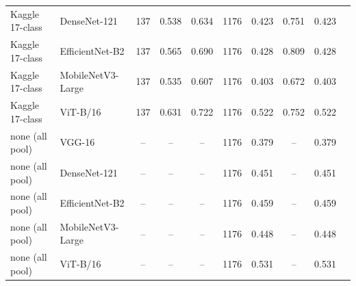 \begin{table}[!tbp]
\begin{tabular}{llcccccccc}
Kaggle 17-class & DenseNet-121 & 137 & 0.538 & 0.634 & 1176 & 0.423 & 0.751 & 0.423 \\
Kaggle 17-class & EfficientNet-B2 & 137 & 0.565 & 0.690 & 1176 & 0.428 & 0.809 & 0.428 \\
Kaggle 17-class & MobileNetV3-Large & 137 & 0.535 & 0.607 & 1176 & 0.403 & 0.672 & 0.403 \\
Kaggle 17-class & ViT-B/16 & 137 & 0.631 & 0.722 & 1176 & 0.522 & 0.752 & 0.522 \\
none (all pool) & VGG-16 & -- & -- & -- & 1176 & 0.379 & -- & 0.379 \\
none (all pool) & DenseNet-121 & -- & -- & -- & 1176 & 0.451 & -- & 0.451 \\
none (all pool) & EfficientNet-B2 & -- & -- & -- & 1176 & 0.459 & -- & 0.459 \\
none (all pool) & MobileNetV3-Large & -- & -- & -- & 1176 & 0.448 & -- & 0.448 \\
none (all pool) & ViT-B/16 & -- & -- & -- & 1176 & 0.531 & -- & 0.531 \\
\hline
\end{tabular}
\end{table}